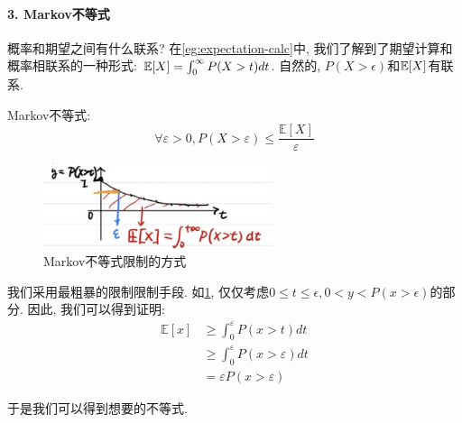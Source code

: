 \paragraph{3. Markov不等式} 概率和期望之间有什么联系? 在\cref{eg:expectation-calc}中, 我们了解到了期望计算和概率相联系的一种形式: $\mathbb E[X]=\int_0^\infty P(X>t) dt$. 自然的, $P(X>\epsilon)$和$\mathbb E[X]$有联系. 

\begin{theorem}
    Markov不等式: 
    $$
\forall \varepsilon>0, P(X>\varepsilon) \leqslant \frac{\mathbb{E}[X]}{\varepsilon}
$$
\end{theorem}

\begin{figure}
    \includegraphics[width=0.6\textwidth]{fig/ch4/markov-ineq.jpg} 
    \caption{Markov不等式限制的方式}
    \label{fig:markov-ineq}
\end{figure}

我们采用最粗暴的限制限制手段. 如\cref{fig:markov-ineq}, 仅仅考虑$0\leq t\leq \epsilon, 0<y<P(x>\epsilon)$的部分. 因此, 我们可以得到证明: 
$$
\begin{aligned}
\mathbb{E}[x] & \geqslant \int_0^{\varepsilon} P(x>t) d t \\
& \geqslant \int_0^{\varepsilon} P(x>\varepsilon) d t \\
& =\varepsilon P(x>\varepsilon)
\end{aligned}
$$

于是我们可以得到想要的不等式. 
